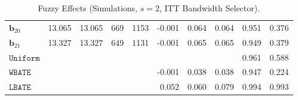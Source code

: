 \documentclass[10pt]{article}
\newcommand{\bb}{\mathbf{b}}
\begin{document}
\begin{table}[p]
\begin{tabular}{lccccrrrrr}
$\bb_{20}$ & 13.065 & 13.065 & 669 & 1153 & -0.001 & 0.064 & 0.064 & 0.951 & 0.376 \\
$\bb_{21}$ & 13.327 & 13.327 & 649 & 1131 & -0.001 & 0.065 & 0.065 & 0.949 & 0.379 \\
\midrule
$\mathtt{Uniform}$ &  &  &  &  &  &  &  & 0.961 & 0.588 \\
\midrule
$\mathtt{WBATE}$ &  &  &  &  & -0.001 & 0.038 & 0.038 & 0.947 & 0.224 \\
\midrule
$\mathtt{LBATE}$ &  &  &  &  & 0.052 & 0.060 & 0.079 & 0.994 & 0.993 \\
\bottomrule\bottomrule
\end{tabular}

    \caption{Fuzzy Effects (Simulations, $s=2$, ITT Bandwidth Selector).}
    \label{tab:sa-simuls-fuzzy-s2}
\end{table}
\end{document}
